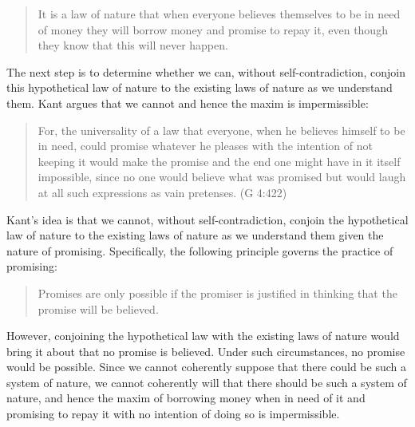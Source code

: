 \begin{quote}
	It is a law of nature that when everyone believes themselves to be in need of money they will borrow money and promise to repay it, even though they know that this will never happen.
\end{quote}

The next step is to determine whether we can, without self-contradiction, conjoin this hypothetical law of nature to the existing laws of nature as we understand them. Kant argues that we cannot and hence the maxim is impermissible:

\begin{quote}
	For, the universality of a law that everyone, when he believes himself to be in need, could promise whatever he pleases with the intention of not keeping it would make the promise and the end one might have in it itself impossible, since no one would believe what was promised but would laugh at all such expressions as vain pretenses. (G 4:422)
\end{quote}

Kant's idea is that we cannot, without self-contradiction, conjoin the hypothetical law of nature to the existing laws of nature as we understand them given the nature of promising. Specifically, the following principle governs the practice of promising:

\begin{quote}
	Promises are only possible if the promiser is justified in thinking that the promise will be believed.
\end{quote}

However, conjoining the hypothetical law with the existing laws of nature would bring it about that no promise is believed. Under such circumstances, no promise would be possible. Since we cannot coherently suppose that there could be such a system of nature, we cannot coherently will that there should be such a system of nature, and hence the maxim of borrowing money when in need of it and promising to repay it with no intention of doing so is impermissible. \change

